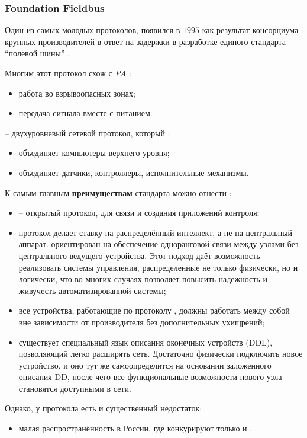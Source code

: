 \subsubsection{Foundation Fieldbus}\label{par:ffbus}
Один из самых молодых протоколов, появился в $1995$ как результат консорциума крупных производителей в ответ на задержки в разработке единого стандарта ``полевой шины'' \cite{galloway_introduction_2012}.

Многим этот протокол схож с \pb \textit{PA} \cite{__2002} :
\begin{itemize}
	\item работа во взрывоопасных зонах;
	\item передача сигнала вместе с питанием.
\end{itemize}
\ffb{} -- двухуровневый сетевой протокол, который \cite{__2001}:
\begin{itemize}
	\item объединяет компьютеры верхнего уровня;
	\item объединяет датчики, контроллеры, исполнительные механизмы.
\end{itemize}

К самым главным \textbf{преимуществам} стандарта можно отнести \cite{__2002, noauthor_foundation_2001}:
\begin{itemize}
	\item \ffb{} -- открытый протокол, для связи и создания приложений контроля;
	\item протокол делает ставку на распределённый интеллект, а не на центральный аппарат.  \ffb ориентирован на обеспечение одноранговой связи между узлами без центрального ведущего устройства. Этот подход даёт возможность реализовать системы управления, распределенные не только физически, но и логически, что во многих случаях позволяет повысить надежность и живучесть автоматизированной системы;
	\item все устройства, работающие по протоколу \ffb, должны работать между собой вне зависимости от производителя без дополнительных ухищрений;
	\item существует специальный язык описания оконечных устройств (DDL), позволяющий легко расширять сеть. Достаточно физически подключить новое устройство, и оно	тут же самоопределится на основании заложенного описания DD, после чего все функциональные возможности нового узла становятся доступными в сети.
\end{itemize}
Однако, у протокола есть и существенный недостаток:
\begin{itemize}
	\item малая распространённость в России, где конкурируют только \mb и \pb. 
\end{itemize}

